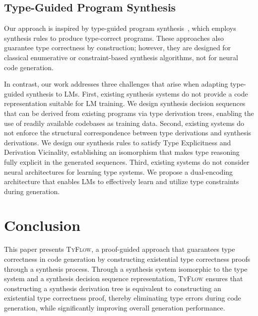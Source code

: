 \documentclass[manuscript,screen]{acmart}
\newcommand{\toolname}[1]{\textsc{#1}}
\newcommand{\mainname}{\toolname{TyFlow}\xspace}
\providecommand{\DIFaddbegin}{} %
\providecommand{\DIFaddend}{} %
\providecommand{\DIFaddincludegraphics}[2][]{{\color{blue}\fbox{\DIFOincludegraphics[#1]{#2}}}} %
\DeclareRobustCommand{\DIFaddbegin}{\DIFOaddbegin \let\includegraphics\DIFaddincludegraphics} %
\DeclareRobustCommand{\DIFaddend}{\DIFOaddend \let\includegraphics\DIFOincludegraphics} %
\begin{document}
\subsection{Type-Guided Program Synthesis}
Our approach is inspired by type-guided program synthesis~\cite{DBLP:journals/pacmpl/GuoJJZWJP20, DBLP:conf/pldi/GuriaFH21, DBLP:conf/pldi/PolikarpovaKS16, DBLP:conf/pldi/OseraZ15}, which employs synthesis rules to produce type-correct programs. These approaches also guarantee type correctness by construction; however, they are designed for classical enumerative or constraint-based synthesis algorithms, not for neural code generation.

In contrast, our work addresses three challenges that arise when adapting type-guided synthesis to LMs.
First, existing synthesis systems do not provide a code representation suitable for LM training. We design synthesis decision sequences that can be derived from existing programs via type derivation trees, enabling the use of readily available codebases as training data.
Second, existing systems do not enforce the structural correspondence between type derivations and synthesis derivations. We design our synthesis rules to satisfy Type Explicitness and Derivation Vicinality, establishing an isomorphism that makes type reasoning fully explicit in the generated sequences.
Third, existing systems do not consider neural architectures for learning type systems. We propose a dual-encoding architecture that enables LMs to effectively learn and utilize type constraints during generation.

\DIFaddbegin 

\DIFaddend \section{Conclusion \label{sec:conclusion}}
This paper presents \mainname, a proof-guided approach that guarantees type correctness in code generation by constructing existential type correctness proofs through a synthesis process. Through a synthesis system isomorphic to the type system and a synthesis decision sequence representation, \mainname ensures that constructing a synthesis derivation tree is equivalent to constructing an existential type correctness proof, thereby eliminating type errors during code generation, while significantly improving overall generation performance. 
\end{document}
